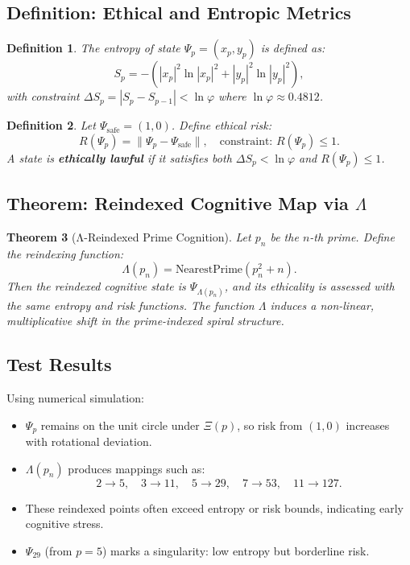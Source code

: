 \documentclass[12]{amsart}
\theoremstyle{plain}
\newtheorem{theorem}{Theorem}[section]
\newtheorem{definition}[theorem]{Definition}
\begin{document}
\subsection{Definition: Ethical and Entropic Metrics}

\begin{definition}
The entropy of state $\Psi_p = (x_p, y_p)$ is defined as:
\[
S_p = -\left(|x_p|^2 \ln |x_p|^2 + |y_p|^2 \ln |y_p|^2\right),
\]
with constraint $\Delta S_p = |S_p - S_{p-1}| < \ln \varphi$ where $\ln \varphi \approx 0.4812$.
\end{definition}

\begin{definition}
Let $\Psi_{\text{safe}} = (1, 0)$. Define ethical risk:
\[
R(\Psi_p) = \|\Psi_p - \Psi_{\text{safe}}\|, \quad \text{constraint: } R(\Psi_p) \leq 1.
\]
A state is \textbf{ethically lawful} if it satisfies both $\Delta S_p < \ln \varphi$ and $R(\Psi_p) \leq 1$.
\end{definition}

\subsection{Theorem: Reindexed Cognitive Map via $\Lambda$}

\begin{theorem}[Λ-Reindexed Prime Cognition]
Let $p_n$ be the $n$-th prime. Define the reindexing function:
\[
\Lambda(p_n) = \text{NearestPrime}(p_n^2 + n).
\]
Then the reindexed cognitive state is $\Psi_{\Lambda(p_n)}$, and its ethicality is assessed with the same entropy and risk functions. The function $\Lambda$ induces a non-linear, multiplicative shift in the prime-indexed spiral structure.
\end{theorem}

\subsection{Test Results}

Using numerical simulation:
\begin{itemize}
  \item $\Psi_p$ remains on the unit circle under $\Xi(p)$, so risk from $(1, 0)$ increases with rotational deviation.
  \item $\Lambda(p_n)$ produces mappings such as:
  \[
  2 \rightarrow 5, \quad 3 \rightarrow 11, \quad 5 \rightarrow 29, \quad 7 \rightarrow 53, \quad 11 \rightarrow 127.
  \]
  \item These reindexed points often exceed entropy or risk bounds, indicating early cognitive stress.
  \item $\Psi_{29}$ (from $p=5$) marks a singularity: low entropy but borderline risk.
\end{itemize}
\end{document}
